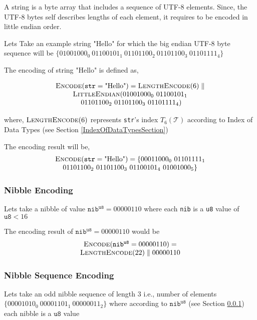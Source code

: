 \documentclass[../alan-handbook.tex]{subfiles}
\begin{document}
A string is a byte array that includes a sequence of UTF-8 elements. Since, the UTF-8 bytes self describes lengths of each element, it requires to be encoded in little endian order.

Lets Take an example string "Hello" for which the big endian UTF-8 byte sequence will be $\{01001000_0 \ 01100101_1 \ 01101100_2 \ 01101100_3 \ 01101111_4\}$

The encoding of string "Hello" is defined as,

$$
\begin{matrix}
    \Call{Encode}{\texttt{str} = \text{"Hello"}} = \Call{LengthEncode}{6} \parallel \\
    \Call{LittleEndian}{01001000_0 \ 01100101_1 \\ 
    \ 01101100_2 \ 01101100_3 \ 01101111_4}
\end{matrix}
$$

where, $\Call{LengthEncode}{6}$ represents \texttt{str}'s index $T_6(\mathcal{T})$ according to Index of Data Types (see Section \ref{IndexOfDataTypesSection})

The encoding result will be,
$$
\begin{matrix}
    \Call{Encode}{\texttt{str} = \text{"Hello"}} = \{00011000_0 \ 01101111_1 \\ 
    01101100_2 \ 01101100_3 \ 01100101_4 \ 01001000_5\}
\end{matrix}
$$


\subsubsection{Nibble Encoding} \label{Eg:NibbleEncoding}

Lets take a nibble of value $\texttt{nib}^{\texttt{u8}} = 00000110$ where each \texttt{nib} is a \texttt{u8} value of $\texttt{u8}<16$

The encoding result of $\texttt{nib}^{\texttt{u8}} = 00000110$ would be 
$$
\begin{matrix}
    \Call{Encode}{\texttt{nib}^{\texttt{u8}} = 00000110} = \\
    \Call{LengthEncode}{22} \parallel 00000110
\end{matrix}
$$

\subsubsection{Nibble Sequence Encoding} \label{Eg:NibbleSequenceEncoding}

Lets take an odd nibble sequence of length $3$ i.e., number of elements $\{00001010_0 \ 00001101_1 \ 00000011_2\}$ where according to $\texttt{nib}^{\texttt{u8}}$ (see Section \ref{Eg:NibbleEncoding}) each nibble is a $\texttt{u8}$ value 
\end{document}
